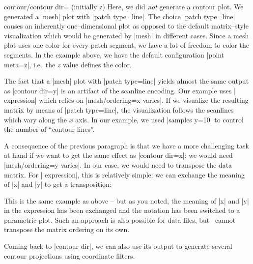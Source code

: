 {{\begin{pgfplotskey}{contour/contour dir= (initially z)}
	Here, we did \emph{not} generate a contour plot. We generated a |mesh| plot with |patch type=line|. The choice |patch type=line| causes an inherently one--dimensional plot as opposed to the default matrix--style visualization which would be generated by |mesh| in different cases. Since a mesh plot uses one color for every patch segment, we have a lot of freedom to color the segments. In the example above, we have the default configuration |point meta=z|, i.e.\ the $z$ value defines the color.

	The fact that a |mesh| plot with |patch type=line| yields almost the same output as |contour dir=y| is an artifact of the scanline encoding. Our example uses | expression| which relies on |mesh/ordering=x varies|. If we visualize the resulting matrix by means of |patch type=line|, the visualization follows the scanlines which vary along the $x$ axis. In our example, we used |samples y=10| to control the number of ``contour lines''.
	
	A consequence of the previous paragraph is that we have a more challenging task at hand if we want to get the same effect as |contour dir=x|: we would need |mesh/ordering=y varies|. In our case, we would need to transpose the data matrix. For | expression|, this is relatively simple: we can exchange the meaning of |x| and |y| to get a transposition:

\pgfplotsexpensiveexample
\begin{codeexample}[]
\end{codeexample}
	This is the same example as above -- but as you noted, the meaning of |x| and |y| in the expression has been exchanged and the notation has been switched to a parametric plot. Such an approach is also possible for data files, but \PGFPlots\ cannot transpose the matrix ordering on its own.
	

	Coming back to |contour dir|, we can also use its output to generate several contour projections using coordinate filters.
\pgfplotsexpensiveexample
\begin{codeexample}[]
\end{codeexample}
\end{pgfplotskey}}}
